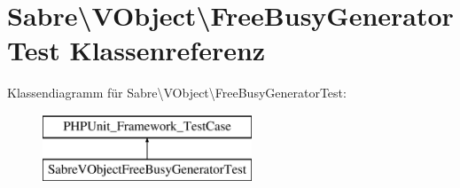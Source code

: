 \hypertarget{class_sabre_1_1_v_object_1_1_free_busy_generator_test}{}\section{Sabre\textbackslash{}V\+Object\textbackslash{}Free\+Busy\+Generator\+Test Klassenreferenz}
\label{class_sabre_1_1_v_object_1_1_free_busy_generator_test}
Klassendiagramm für Sabre\textbackslash{}V\+Object\textbackslash{}Free\+Busy\+Generator\+Test\+:\begin{figure}[H]
\begin{center}
\leavevmode
\includegraphics[height=2.000000cm]{class_sabre_1_1_v_object_1_1_free_busy_generator_test}
\end{center}
\end{figure}
